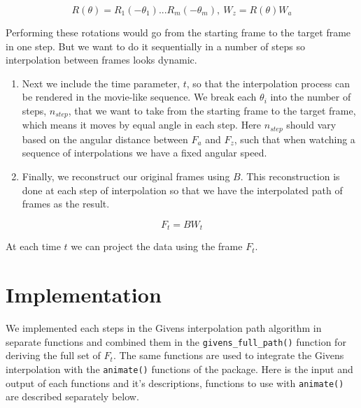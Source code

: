\[R(\theta) = R_1(-\theta_1) ... R_m(-\theta_m), \    W_z = R(\theta)W_a\]

Performing these rotations would go from the starting frame to the
target frame in one step. But we want to do it sequentially in a number
of steps so interpolation between frames looks dynamic.

\begin{enumerate}
\def\labelenumi{\arabic{enumi}.}
\setcounter{enumi}{4}
\item
  Next we include the time parameter, \(t\), so that the interpolation
  process can be rendered in the movie-like sequence. We break each
  \(\theta_i\) into the number of steps, \(n_{step}\), that we want to
  take from the starting frame to the target frame, which means it moves
  by equal angle in each step. Here \(n_{step}\) should vary based on
  the angular distance between \(F_a\) and \(F_z\), such that when
  watching a sequence of interpolations we have a fixed angular speed.
\item
  Finally, we reconstruct our original frames using \(B\). This
  reconstruction is done at each step of interpolation so that we have
  the interpolated path of frames as the result.
\end{enumerate}

\[F_t = B  W_t\]

At each time \(t\) we can project the data using the frame \(F_t\).

\hypertarget{implementation}{%
\section{Implementation}\label{implementation}}

We implemented each steps in the Givens interpolation path algorithm in
separate functions and combined them in the
\texttt{givens\_full\_path()} function for deriving the full set of
\(F_t\). The same functions are used to integrate the Givens
interpolation with the \texttt{animate()} functions of the
 package. Here is the input and output of each functions
and it's descriptions, functions to use with \texttt{animate()} are
described separately below.

